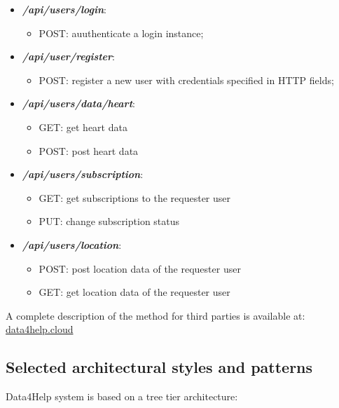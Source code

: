 \documentclass[DD.tex]{subfiles}
\begin{document}
\begin{itemize}
	
	\item \textit{\textbf{/api/users/login}}:
		\begin{itemize}
			\item POST: auuthenticate a login instance;
		\end{itemize}
	\item \textit{\textbf{/api/user/register}}:
		\begin{itemize}
			\item POST: register a new user with credentials specified in HTTP fields;
		\end{itemize}	
	\item \textit{\textbf{/api/users/data/heart}}:	
		\begin{itemize}
			\item GET: get heart data
			\item POST: post heart data
		\end{itemize}	
	\item \textit{\textbf{/api/users/subscription}}:
		\begin{itemize}
			\item GET: get subscriptions to the requester user
			\item PUT: change subscription status
		\end{itemize}
	\item \textit{\textbf{/api/users/location}}:
		\begin{itemize}
			\item POST: post location data of the requester user
			\item GET: get location data of the requester user
		\end{itemize}
\end{itemize}

A complete description of the method for third parties is available at: \url{data4help.cloud}


\newpage
\subsection{Selected architectural styles and patterns}
Data4Help system is based on a tree tier architecture:
\end{document}
